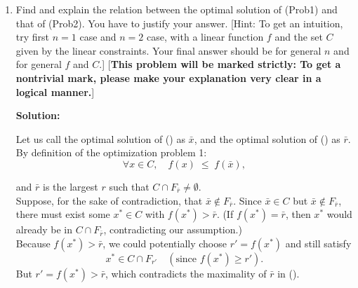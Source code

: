 \documentclass[12pt]{article}
\newenvironment{solution}
  {\par\noindent\textbf{Solution:}\par}
  {\par}
\begin{document}
\begin{enumerate}
\begin{enumerate}[label=\alph*]
      \item Find and explain the relation between the optimal solution of (Prob1) and that of (Prob2). You have to justify your answer. [Hint: To get an intuition, try first $n=1$ case and $n=2$ case, with a linear function $f$ and the set $C$ given by the linear constraints. Your final answer should be for general $n$ and for general $f$ and $C$.] [\textbf{This problem will be marked strictly: To get a nontrivial mark, please make your explanation very clear in a logical manner.}]
      \begin{solution}
          Let us call the optimal solution of () as $\bar{x}$, and the optimal solution of () as $\bar{r}$. 
          By definition of the optimization problem 1:
          \[
           \forall x \in C,\quad f(x) \;\le\; f(\bar{x}),
          \]

          and $\bar{r}$ is the largest $r$ such that $C \cap F_{\bar{r}} \neq \emptyset$. \\ 

          Suppose, for the sake of contradiction, that $\bar{x} \notin F_{\bar{r}}$. Since $\bar{x} \in C$ but $\bar{x} \notin F_{\bar{r}}$, there must exist some $x^* \in C$ with $f(x^*) > \bar{r}$. (If $f(x^*) = \bar{r}$, then $x^*$ would already be in $C \cap F_{\bar{r}}$, contradicting our assumption.)
          \\ 
          Because $f(x^*) > \bar{r}$, we could potentially choose $r' = f(x^*)$ and still satisfy 
          \[
          x^* \in C \cap F_{r'} \quad (\text{since } f(x^*) \ge r').
          \] 
          But $r' = f(x^*) > \bar{r}$, which contradicts the maximality of $\bar{r}$ in (). 
          \\


\end{solution}
\end{enumerate}
\end{enumerate}
\end{document}
